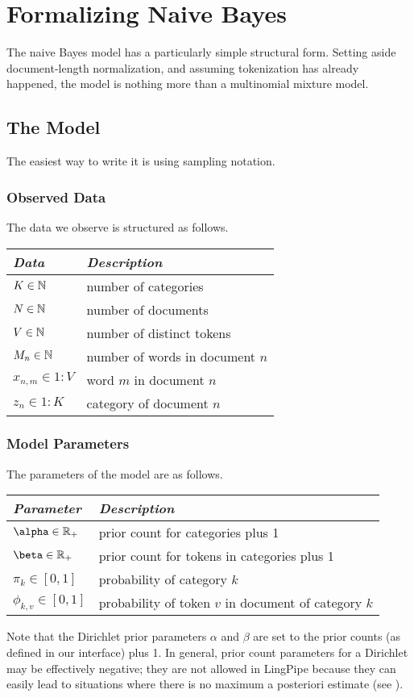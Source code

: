 \section{Formalizing Naive Bayes}

The naive Bayes model has a particularly simple structural form.
Setting aside document-length normalization, and assuming tokenization
has already happened, the model is nothing more than a multinomial
mixture model.  

\subsection{The Model}

The easiest way to write it is using sampling notation.  


\subsubsection{Observed Data}

The data we observe is structured as follows.
%
\begin{center}
\begin{tabular}{l|l}
{\it Data} & {\it Description}
\\ \hline
$K \in {\mathbb N}$ & number of categories
\\ 
$N \in {\mathbb N}$ & number of documents
\\
$V \in {\mathbb N}$ & number of distinct tokens
\\
$M_n \in {\mathbb N}$ & number of words in document $n$
\\
$x_{n,m} \in 1{:}V$ & word $m$ in document $n$
\\
$z_n \in 1{:}K$ & category of document $n$
\end{tabular}
\end{center}

\subsubsection{Model Parameters}

The parameters of the model are as follows.
%
\begin{center}
\begin{tabular}{l|l}
{\it Parameter} & {\it Description}
\\ \hline
$\alpha \in \posreals$ &  prior count for categories plus 1
\\
$\beta \in \posreals$ & prior count for tokens in categories plus 1
\\
$\pi_k \in [0,1]$ & probability of category $k$
\\
$\phi_{k,v} \in [0,1]$ & probability of token $v$ in document of category $k$
\end{tabular}
\end{center}
%
Note that the Dirichlet prior parameters $\alpha$ and $\beta$ are set
to the prior counts (as defined in our interface) plus 1.  In general,
prior count parameters for a Dirichlet may be effectively negative; they
are not allowed in LingPipe because they can easily lead to situations
where there is no maximum a posteriori estimate (see ).


